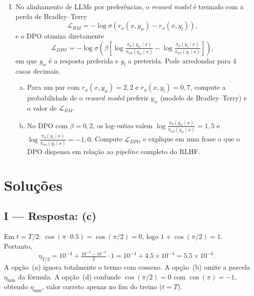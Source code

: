 \documentclass{dlproblemset}
\begin{document}
\begin{enumerate}[I)]
\item No alinhamento de LLMs por preferências, o \textit{reward model} é treinado com a perda de Bradley--Terry
\[
\mathcal{L}_{RM} = -\log \sigma\!\left(r_\phi(x, y_w) - r_\phi(x, y_l)\right),
\]
e o DPO otimiza diretamente
\[
\mathcal{L}_{DPO} = -\log \sigma\!\left(\beta\left[\log\tfrac{\pi_\theta(y_w \mid x)}{\pi_{\text{ref}}(y_w \mid x)} - \log\tfrac{\pi_\theta(y_l \mid x)}{\pi_{\text{ref}}(y_l \mid x)}\right]\right),
\]
em que $y_w$ é a resposta preferida e $y_l$ a preterida. Pode arredondar para $4$ casas decimais.

\begin{enumerate}[a)]
    \item Para um par com $r_\phi(x, y_w) = 2{,}2$ e $r_\phi(x, y_l) = 0{,}7$, compute a probabilidade de o \textit{reward model} preferir $y_w$ (modelo de Bradley--Terry) e o valor de $\mathcal{L}_{RM}$.

    \item No DPO com $\beta = 0{,}2$, os log-\textit{ratios} valem $\log\tfrac{\pi_\theta(y_w \mid x)}{\pi_{\text{ref}}(y_w \mid x)} = 1{,}5$ e $\log\tfrac{\pi_\theta(y_l \mid x)}{\pi_{\text{ref}}(y_l \mid x)} = -1{,}0$. Compute $\mathcal{L}_{DPO}$ e explique em uma frase o que o DPO dispensa em relação ao \textit{pipeline} completo do RLHF.
\end{enumerate}

\end{enumerate}


\section*{Soluções}

\subsection*{I — Resposta: (c)}
Em $t = T/2$: $\cos(\pi \cdot 0.5) = \cos(\pi/2) = 0$, logo
$1 + \cos(\pi/2) = 1$. Portanto,
\[
  \eta_{T/2} = 10^{-4} + \tfrac{10^{-3} - 10^{-4}}{2}\cdot 1
             = 10^{-4} + 4.5\times 10^{-4}
             = 5.5\times 10^{-4}.
\]
A opção~(a) ignora totalmente o termo com cosseno.
A opção~(b) omite a parcela $\eta_{\min}$ da fórmula.
A opção~(d) confunde $\cos(\pi/2) = 0$ com $\cos(\pi) = -1$, obtendo
$\eta_{\min}$, valor correto apenas no fim do treino ($t = T$).
\end{document}

